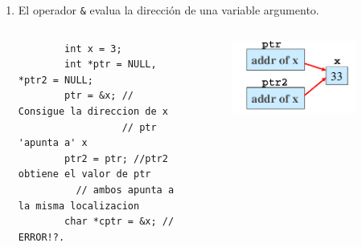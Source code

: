 \documentclass[serif, professionalfont]{beamer}
\newcommand\Fontvia{\fontsize{8}{9.2}\selectfont}
\begin{document}
\begin{frame}[fragile]{}
\begin{enumerate}
\item El operador \texttt{\&} evalua la direcci\'on de una variable argumento.
\Fontvia
\begin{columns}
	\begin{column}{0.4\textwidth}
		\begin{verbatim}
		int x = 3;
		int *ptr = NULL, *ptr2 = NULL;
		ptr = &x; // Consigue la direccion de x
		          // ptr 'apunta a' x 
		ptr2 = ptr; //ptr2 obtiene el valor de ptr
		  // ambos apunta a la misma localizacion
		char *cptr = &x; // ERROR!?. 
		\end{verbatim}
	\end{column}
	\begin{column}{0.2\textwidth}
		\begin{figure}[h]
			\centering
			\includegraphics[scale=.3]{j4.png}
		\end{figure}
	\end{column}
	​  \end{columns}
\end{enumerate}
\end{frame}
\end{document}
